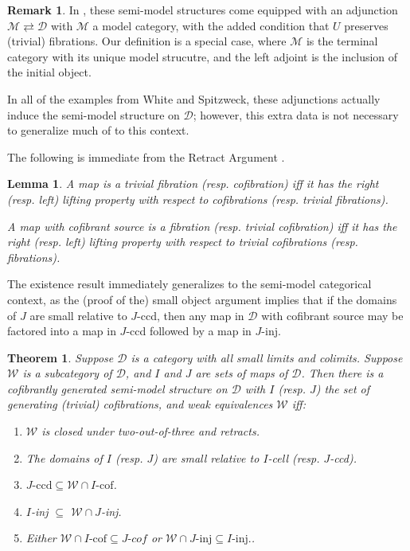 \documentclass[a4paper,10pt
,draft
]{article}%
\numberwithin{equation}{section}
\numberwithin{figure}{section}
\newtheorem{theorem}[equation]{Theorem}%
\newtheorem{lemma}[equation]{Lemma}%
\theoremstyle{definition} %
\newtheorem{remark}[equation]{Remark}%
\newcommand{\1}{\ensuremath{\mathbbm 1}}%
\begin{document}
\begin{remark}
      In \cite{Spi01,Wh16}, these semi-model structures come equipped with an adjunction $\mathcal M \rightleftarrows \mathcal D$ with $\mathcal M$ a model category,
      with the added condition that $U$ preserves (trivial) fibrations.
      Our definition is a special case, where $\mathcal M$ is the terminal category with its unique model strucutre,
      and the left adjoint is the inclusion of the initial object.

      In all of the examples from White and Spitzweck, these adjunctions actually induce the semi-model structure on $\mathcal D$;
      however, this extra data is not necessary to generalize much of \cite{Hov99} to this context.
\end{remark}

The following is immediate from the Retract Argument \cite[Lemma 1.1.9]{Hov99}.
\begin{lemma}
      A map is a trivial fibration (resp. cofibration) iff it has the right (resp. left) lifting property with respect to cofibrations (resp. trivial fibrations).
      
      A map with cofibrant source is a fibration (resp. trivial cofibration) iff it has the right (resp. left) lifting property with respect to trivial cofibrations (resp. fibrations).
\end{lemma}

The existence result \cite[Theorem 2.1.19]{Hov99} immediately generalizes to the semi-model categorical context,
as the (proof of the) small object argument \cite[Lemma 2.1.14]{Hov99} implies that
if the domains of $J$ are small relative to $J$-ccd,
then any map in $\mathcal D$ with cofibrant source may be factored into a map in $J$-ccd followed by a map in $J$-inj.
\begin{theorem}\label{SEMIMS_THM}
      Suppose $\mathcal D$ is a category with all small limits and colimits.
      Suppose $\mathcal W$ is a subcategory of $\mathcal D$, and $I$ and $J$ are sets of maps of $\mathcal D$.
      Then there is a cofibrantly generated semi-model structure on $\mathcal D$ with
      $I$ (resp. $J$) the set of generating (trivial) cofibrations, and weak equivalences $\mathcal W$ iff:
      \begin{enumerate}[label = (\roman*)]
      \item $\mathcal W$ is closed under two-out-of-three and retracts.
      \item The domains of $I$ (resp. $J$) are small relative to $I$-cell (resp. $J$-ccd).
      \item $J\text{-ccd} \subseteq \mathcal W \cap I\text{-cof}$.
      \item $I$-inj $\subseteq$ $\mathcal W \cap J$-inj.
      \item Either $\mathcal W \cap I\text{-cof} \subseteq J\textit{-cof}$ or $\mathcal W \cap J\text{-inj} \subseteq I\text{-inj}.$.
      \end{enumerate}
\end{theorem}
\end{document}
